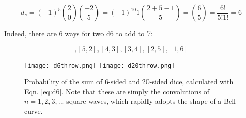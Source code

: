\begin{equation}
d_s = (-1)^5 {2 \choose 0}{-2 \choose 5} = (-1)^{10} 1 {2+5-1 \choose 5} = {6 \choose 5} = \frac{6!}{5!1!} = 6
\label{eq:d6}
\end{equation}

Indeed, there are 6 ways for two d6 to add to 7:

\begin{equation}
[6,1],[5,2],[4,3],[3,4],[2,5],[1,6]
\end{equation}


\begin{figure}
\centering
\texttt{[image: d6throw.png]}
\texttt{[image: d20throw.png]}
\caption{Probability of the sum of 6-sided and 20-sided dice, calculated with Eqn. \ref{eq:d6}. Note that these are simply the convolutions of $n=1,2,3,...$ square waves, which rapidly adopts the shape of a Bell curve.}
\end{figure}
